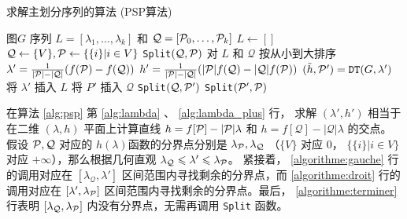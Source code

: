 \renewcommand{\algorithmicrequire}{\textbf{输入：}\unskip}
\renewcommand{\algorithmicensure}{\textbf{输出：}\unskip}

\begin{algorithm}[!ht]
  \caption{求解主划分序列的算法 (PSP算法)}
  \label{alg:psp}
  \small
  \begin{algorithmic}[1]
    \REQUIRE 图$G$
    \ENSURE 序列 $L=[\lambda_1, \dots, \lambda_k]$
    和 $\mathcal{Q}=[\P_0, \dots, \P_k]$
    \STATE $L \leftarrow []$
    \STATE $\mathcal{Q}\leftarrow \{V\}, \P \leftarrow \{ \{i \} | i \in V\}$
    \STATE \texttt{Split}$(\mathcal{Q},\P)$
    \STATE 对 $L$ 和 $\mathcal{Q}$
    按从小到大排序 \footnotemark
     \STATE\label{alg:lambda} $\lambda' =
     {1 \over \abs{\P} - \abs{\mathcal{Q}}}
     (f(\P)-f(\mathcal{Q}))$
     \STATE\label{alg:lambda_plus} $h' = {1 \over \abs{\P} - \abs{\mathcal{Q}}} 
     (\abs{\P} f(\mathcal{Q}) - \abs{\mathcal{Q}} f(\P))$
     \STATE\label{alg:lambda_f} $(\tilde{h}, \P') = \texttt{DT}(G,\lambda')$
       \STATE\label{algorithme:terminer} 将 $\lambda'$ 插入 $L$
     \ELSE
       \STATE 将 $P'$ 插入 $\mathcal{Q}$
       \STATE\label{algorithme:gauche} \texttt{Split}$(\mathcal{Q}, \P')$
       \STATE\label{algorithme:droit} \texttt{Split}$(\P',\P)$
     \ENDIF
    \ENDFUNCTION
  \end{algorithmic}
\end{algorithm}


在算法 \ref{alg:psp} 第 \ref{alg:lambda} 、 \ref{alg:lambda_plus} 行，
求解 $(\lambda', h')$ 相当于在二维 $(\lambda, h)$
平面上计算直线
$h = f[\P] - |\P| \lambda $
和 $h = f[\mathcal{Q}] - |\mathcal{Q}| \lambda $ 的交点。
假设 $\P, \mathcal{Q}$ 对应的
$h(\lambda)$函数的分界点分别是 $\lambda_{\P}, \lambda_{\mathcal{Q}}$
（$\{V\}$ 对应 0，
$\{\{i\}|i\in V\}$ 对应 $+\infty$），那么根据几何直观
$\lambda_{\mathcal{Q}} \leq \lambda' \leq \lambda_{\P}$。
紧接着， \ref{algorithme:gauche} 行的调用对应在
$[\lambda_{\mathcal{Q}}, \lambda']$
区间范围内寻找剩余的分界点，而
 \ref{algorithme:droit} 行的调用对应在
$[\lambda', \lambda_{\P}]$
区间范围内寻找剩余的分界点。最后，
 \ref{algorithme:terminer} 行表明
$[\lambda_{\mathcal{Q}}, \lambda_{\P}]$ 内没有分界点，无需再调用
\texttt{Split} 函数。

